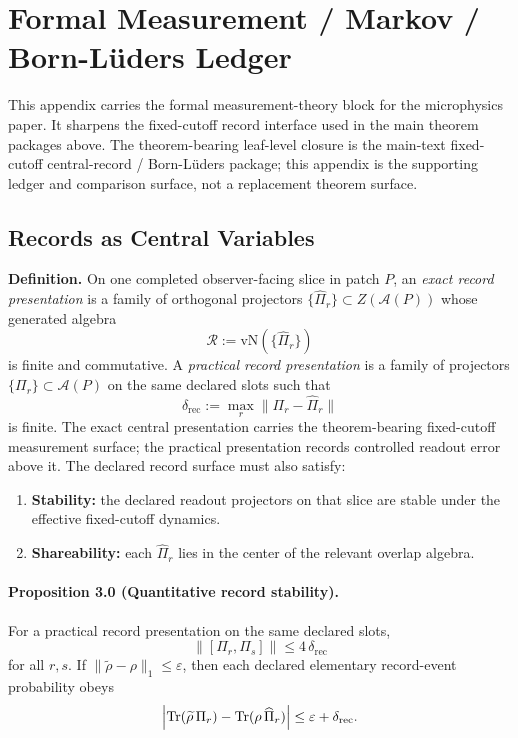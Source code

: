\section{Formal Measurement / Markov / Born-L\"uders Ledger}
\label{app:microphysics-measurement-ledger}

This appendix carries the formal measurement-theory block for the microphysics paper. It sharpens
the fixed-cutoff
record interface used in the main theorem packages above. The theorem-bearing leaf-level
closure is the main-text fixed-cutoff central-record / Born-L\"uders package; this appendix is
the supporting ledger and comparison surface, not a replacement theorem surface.

\subsection{Records as Central Variables}

\textbf{Definition.} On one completed observer-facing slice in patch \(P\), an \emph{exact record
presentation} is a family of orthogonal projectors
\(\{\widehat\Pi_r\}\subset Z(\mathcal A(P))\) whose generated algebra
\[
\mathcal R:=\mathrm{vN}(\{\widehat\Pi_r\})
\]
is finite and commutative. A \emph{practical record presentation} is a family of projectors
\(\{\Pi_r\}\subset\mathcal A(P)\) on the same declared slots such that
\[
\delta_{\mathrm{rec}}:=\max_r \|\Pi_r-\widehat\Pi_r\|
\]
is finite. The exact central presentation carries the theorem-bearing fixed-cutoff measurement
surface; the practical presentation records controlled readout error above it. The declared record
surface must also satisfy:
\begin{enumerate}[leftmargin=2em]
\item \textbf{Stability:} the declared readout projectors on that slice are stable under the effective fixed-cutoff dynamics.
\item \textbf{Shareability:} each \(\widehat\Pi_r\) lies in the center of the relevant overlap algebra.
\end{enumerate}

\paragraph{\textbf{Proposition 3.0 (Quantitative record stability).}}
For a practical record presentation on the same declared slots,
\[
\|[\Pi_r,\Pi_s]\|\le 4\,\delta_{\mathrm{rec}}
\]
for all \(r,s\). If \(\|\widetilde\rho-\rho\|_1\le\varepsilon\), then each declared elementary
record-event probability obeys
\[
\Bigl|
\operatorname{Tr}(\widetilde\rho\,\Pi_r)
-
\operatorname{Tr}(\rho\,\widehat\Pi_r)
\Bigr|
\le
\varepsilon+\delta_{\mathrm{rec}}.
\]

